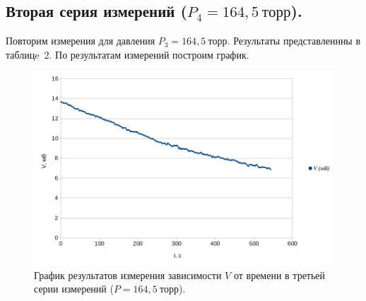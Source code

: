 \documentclass[a4paper,11pt]{article}
\begin{document}
\subsection{Вторая серия измерений ($P_{4} = 164,5\ торр$).}
Повторим измерения для давления $P_{3} = 164,5\ торр$. Результаты представленнны в таблицe~2.
По результатам измерений построим график.
\begin{figure}[h!]\label{fig:img4}
  \centering
  \includegraphics[scale = 0.4125]{graph2.png}
  \caption{График результатов измерения зависимости $V$ от времени в третьей серии измерений ($P = 164,5\ торр$).}
\end{figure}
\end{document}
